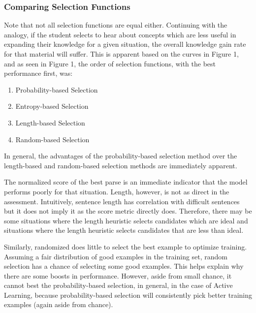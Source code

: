 \documentclass{article} %
\begin{document}
\subsubsection{Comparing Selection Functions}

Note that not all selection functions are equal either. Continuing with the analogy, if the student selects to hear about concepts which are less useful in expanding their knowledge for a given situation, the overall knowledge gain rate for that material will suffer. This is apparent based on the curves in Figure 1, and as seen in Figure 1, the order of selection functions, with the best performance first, was:

\begin{enumerate}
\item Probability-based Selection
\item Entropy-based Selection
\item Length-based Selection
\item Random-based Selection
\end{enumerate}

In general, the advantages of the probability-based selection method over the length-based and random-based selection methods are immediately apparent. 

The normalized score of the best parse is an immediate indicator that the model performs poorly for that situation. Length, however, is not as direct in the assessment. Intuitively, sentence length has correlation with difficult sentences but it does not imply it as the score metric directly does. Therefore, there may be some situations where the length heuristic selects candidates which are ideal and situations where the length heuristic selects candidates that are less than ideal.

Similarly, randomized does little to select the best example to optimize training. Assuming a fair distribution of good examples in the training set, random selection has a chance of selecting some good examples. This helps explain why there are some boosts in performance. However, aside from small chance, it cannot best the probability-based selection, in general, in the case of Active Learning, because probability-based selection will consistently pick better training examples (again aside from chance).
\end{document}
